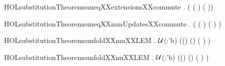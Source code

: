 \newcommand{\HOLsubstitutionTheoremsSubstXXsameXXsize}{\UseVerbatim{HOLsubstitutionTheoremsSubstXXsameXXsize}}
\begin{SaveVerbatim}{HOLsubstitutionTheoremsuneqXXextensionsXXcommute}
\HOLTokenTurnstile{} \HOLSymConst{\HOLTokenForall{}}    .
      \HOLSymConst{\HOLTokenNotEqual{}}  \HOLSymConst{\HOLTokenImp{}}
     (   (   ) \HOLSymConst{=}
         (   ))
\end{SaveVerbatim}
\newcommand{\HOLsubstitutionTheoremsuneqXXextensionsXXcommute}{\UseVerbatim{HOLsubstitutionTheoremsuneqXXextensionsXXcommute}}
\begin{SaveVerbatim}{HOLsubstitutionTheoremsuneqXXmmUpdatesXXcommute}
\HOLTokenTurnstile{} \HOLSymConst{\HOLTokenForall{}}    .
      \HOLSymConst{\HOLTokenNotEqual{}}  \HOLSymConst{\HOLTokenImp{}}
     (  (   )  \HOLSymConst{=}
        (   ) )
\end{SaveVerbatim}
\newcommand{\HOLsubstitutionTheoremsuneqXXmmUpdatesXXcommute}{\UseVerbatim{HOLsubstitutionTheoremsuneqXXmmUpdatesXXcommute}}
\begin{SaveVerbatim}{HOLsubstitutionTheoremsunfoldXXmuXXLEM}
\HOLTokenTurnstile{} \HOLSymConst{\HOLTokenForall{}}    .
      \ensuremath{\cal{U}}(:'b) \HOLSymConst{\HOLTokenImp{}}
     ((\HOLSymConst{,}\HOLSymConst{,})     \HOLSymConst{\HOLTokenEquiv{}}
      (\HOLSymConst{,}\HOLSymConst{,})   (  )  )
\end{SaveVerbatim}
\newcommand{\HOLsubstitutionTheoremsunfoldXXmuXXLEM}{\UseVerbatim{HOLsubstitutionTheoremsunfoldXXmuXXLEM}}
\begin{SaveVerbatim}{HOLsubstitutionTheoremsunfoldXXnuXXLEM}
\HOLTokenTurnstile{} \HOLSymConst{\HOLTokenForall{}}    .
      \ensuremath{\cal{U}}(:'b) \HOLSymConst{\HOLTokenImp{}}
     ((\HOLSymConst{,}\HOLSymConst{,})     \HOLSymConst{\HOLTokenEquiv{}}
      (\HOLSymConst{,}\HOLSymConst{,})   (  )  )
\end{SaveVerbatim}
